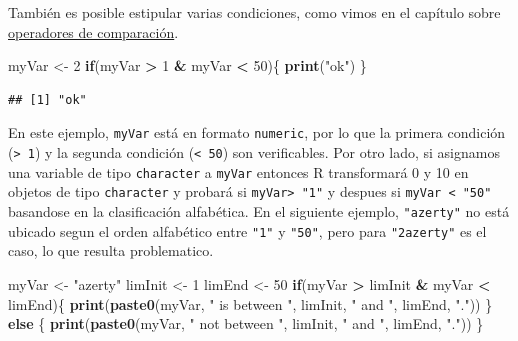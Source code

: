 \documentclass[
]{book}
\newenvironment{Shaded}{\begin{snugshade}}{\end{snugshade}}
\newcommand{\ControlFlowTok}[1]{\textcolor[rgb]{0.13,0.29,0.53}{\textbf{#1}}}
\newcommand{\DecValTok}[1]{\textcolor[rgb]{0.00,0.00,0.81}{#1}}
\newcommand{\KeywordTok}[1]{\textcolor[rgb]{0.13,0.29,0.53}{\textbf{#1}}}
\newcommand{\NormalTok}[1]{#1}
\newcommand{\OperatorTok}[1]{\textcolor[rgb]{0.81,0.36,0.00}{\textbf{#1}}}
\newcommand{\StringTok}[1]{\textcolor[rgb]{0.31,0.60,0.02}{#1}}
\begin{document}
También es posible estipular varias condiciones, como vimos en el capítulo sobre \protect\hyperlink{l011opcomp}{operadores de comparación}.

\begin{Shaded}
\begin{Highlighting}[]
\NormalTok{myVar <-}\StringTok{ }\DecValTok{2}
\ControlFlowTok{if}\NormalTok{(myVar }\OperatorTok{>}\StringTok{ }\DecValTok{1} \OperatorTok{&}\StringTok{ }\NormalTok{myVar }\OperatorTok{<}\StringTok{ }\DecValTok{50}\NormalTok{)\{}
  \KeywordTok{print}\NormalTok{(}\StringTok{"ok"}\NormalTok{)}
\NormalTok{\}}
\end{Highlighting}
\end{Shaded}

\begin{verbatim}
## [1] "ok"
\end{verbatim}

En este ejemplo, \texttt{myVar} está en formato \texttt{numeric}, por lo que la primera condición (\texttt{\textgreater{}\ 1}) y la segunda condición (\texttt{\textless{}\ 50}) son verificables. Por otro lado, si asignamos una variable de tipo \texttt{character} a \texttt{myVar} entonces R transformará 0 y 10 en objetos de tipo \texttt{character} y probará si \texttt{myVar\textgreater{}\ "1"} y despues si \texttt{myVar\ \textless{}\ "50"} basandose en la clasificación alfabética. En el siguiente ejemplo, \texttt{"azerty"} no está ubicado segun el orden alfabético entre \texttt{"1"} y \texttt{"50"}, pero para \texttt{"2azerty"} es el caso, lo que resulta problematico.

\begin{Shaded}
\begin{Highlighting}[]
\NormalTok{myVar <-}\StringTok{ "azerty"}
\NormalTok{limInit <-}\StringTok{ }\DecValTok{1}
\NormalTok{limEnd <-}\StringTok{ }\DecValTok{50}
\ControlFlowTok{if}\NormalTok{(myVar }\OperatorTok{>}\StringTok{ }\NormalTok{limInit }\OperatorTok{&}\StringTok{ }\NormalTok{myVar }\OperatorTok{<}\StringTok{ }\NormalTok{limEnd)\{}
  \KeywordTok{print}\NormalTok{(}\KeywordTok{paste0}\NormalTok{(myVar, }\StringTok{" is between "}\NormalTok{, limInit, }\StringTok{" and "}\NormalTok{, limEnd, }\StringTok{"."}\NormalTok{))}
\NormalTok{\} }\ControlFlowTok{else}\NormalTok{ \{}
  \KeywordTok{print}\NormalTok{(}\KeywordTok{paste0}\NormalTok{(myVar, }\StringTok{" not between "}\NormalTok{, limInit, }\StringTok{" and "}\NormalTok{, limEnd, }\StringTok{"."}\NormalTok{))}
\NormalTok{\}}
\end{Highlighting}
\end{Shaded}
\end{document}
